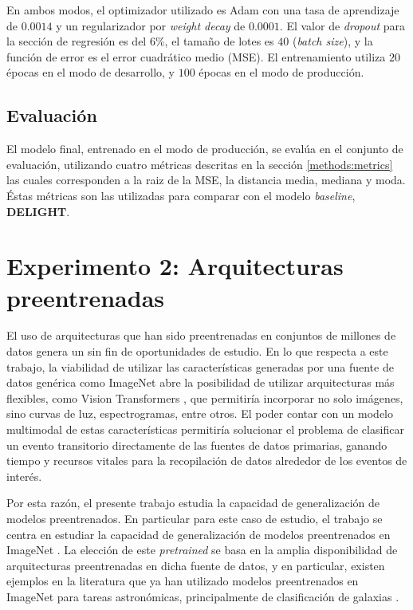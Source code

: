 \documentclass[../tesis.tex]{subfiles}
\begin{document}
En ambos modos, el optimizador utilizado es Adam \cite{adam} con una tasa de aprendizaje de $0.0014$ y un regularizador por \textit{weight decay} de $0.0001$. El valor de \textit{dropout} para la sección de regresión es del 6\%, el tamaño de lotes es $40$ (\textit{batch size}), y la función de error es el error cuadrático medio (MSE). El entrenamiento utiliza $20$ épocas en el modo de desarrollo, y $100$ épocas en el modo de producción.\par\null\par

\subsection{Evaluación}
El modelo final, entrenado en el modo de producción, se evalúa en el conjunto de evaluación, utilizando cuatro métricas descritas en la sección \ref{methods:metrics} las cuales corresponden a la raiz de la MSE, la distancia media, mediana y moda. Éstas métricas son las utilizadas para comparar con el modelo \textit{baseline}, \textbf{DELIGHT}.

\section{Experimento 2: Arquitecturas preentrenadas}\label{methods:pretrained_arc}
El uso de arquitecturas que han sido preentrenadas en conjuntos de millones de datos genera un sin fin de oportunidades de estudio. En lo que respecta a este trabajo, la viabilidad de utilizar las características generadas por una fuente de datos genérica como ImageNet abre la posibilidad de utilizar arquitecturas más flexibles, como Vision Transformers \cite{ViT}, que permitiría incorporar no solo imágenes, sino curvas de luz, espectrogramas, entre otros. El poder contar con un modelo multimodal de estas características permitiría solucionar el problema de clasificar un evento transitorio directamente de las fuentes de datos primarias, ganando tiempo y recursos vitales para la recopilación de datos alrededor de los eventos de interés.\par\null\par

Por esta razón, el presente trabajo estudia la capacidad de generalización de modelos preentrenados. En particular para este caso de estudio, el trabajo se centra en estudiar la capacidad de generalización de modelos preentrenados en ImageNet \cite{imagenet}. La elección de este \textit{pretrained} se basa en la amplia disponibilidad de arquitecturas preentrenadas en dicha fuente de datos, y en particular, existen ejemplos en la literatura que ya han utilizado modelos preentrenados en ImageNet para tareas astronómicas, principalmente de clasificación de galaxias \cite{galaxytransferlearning}.\par\null\par
\end{document}
